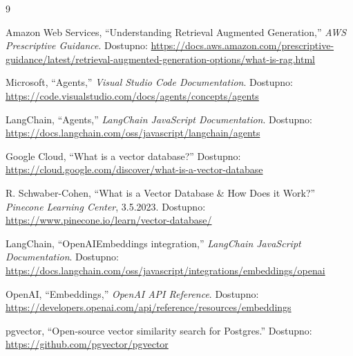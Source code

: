 \renewcommand{\bibname}{Literatura}
\begin{thebibliography}{9}
    \ifdiffversion
        \item[] 
    \fi
    Amazon Web Services, ``Understanding Retrieval Augmented Generation,'' \textit{AWS Prescriptive Guidance}. Dostupno: \url{https://docs.aws.amazon.com/prescriptive-guidance/latest/retrieval-augmented-generation-options/what-is-rag.html}

    Microsoft, ``Agents,'' \textit{Visual Studio Code Documentation}. Dostupno: \url{https://code.visualstudio.com/docs/agents/concepts/agents}

    LangChain, ``Agents,'' \textit{LangChain JavaScript Documentation}. Dostupno: \url{https://docs.langchain.com/oss/javascript/langchain/agents}

    Google Cloud, ``What is a vector database?'' Dostupno: \url{https://cloud.google.com/discover/what-is-a-vector-database}

    R. Schwaber-Cohen, ``What is a Vector Database \& How Does it Work?'' \textit{Pinecone Learning Center}, 3.5.2023. Dostupno: \url{https://www.pinecone.io/learn/vector-database/}

    LangChain, ``OpenAIEmbeddings integration,'' \textit{LangChain JavaScript Documentation}. Dostupno: \url{https://docs.langchain.com/oss/javascript/integrations/embeddings/openai}

    OpenAI, ``Embeddings,'' \textit{OpenAI API Reference}. Dostupno: \url{https://developers.openai.com/api/reference/resources/embeddings}

    pgvector, ``Open-source vector similarity search for Postgres.'' Dostupno: \url{https://github.com/pgvector/pgvector}


\end{thebibliography}
